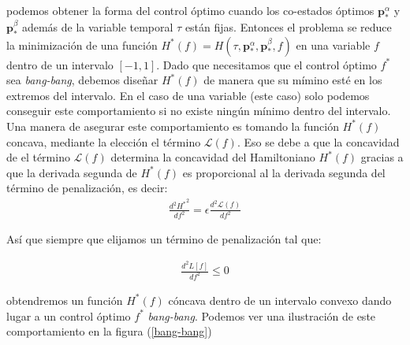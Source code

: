 podemos obtener la forma del control óptimo cuando los co-estados óptimos $\bm{p}_*^\alpha$ y $\bm{p}_*^\beta$ además de la variable temporal $\tau$ están fijas. 
%
Entonces el problema se reduce la minimización de una función $H^*(f) = H(\tau,\bm{p}_*^\alpha,\bm{p}^\beta_*,f)$ en una variable $f$ dentro de un intervalo $[-1,1]$.
%
Dado que necesitamos que el control óptimo $f^*$ sea \emph{bang-bang}, debemos diseñar  $H^*(f)$ de manera que su mímino esté en los extremos del intervalo.
%
En el caso de una variable (este caso) solo podemos conseguir este comportamiento si no existe ningún mínimo dentro del intervalo. Una manera de asegurar este comportamiento es tomando la función $H^*(f)$ concava, mediante la elección el término $\mathcal{L}(f)$. Eso se debe a que la concavidad de el término $\mathcal{L}(f)$ determina la concavidad del Hamiltoniano $H^*(f)$ gracias a que la derivada segunda de $H^*(f)$ es proporcional al la derivada segunda del término de penalización, es decir:
\begin{gather}
    \frac{d^2{H^*}^2}{df^2} = \epsilon \frac{d^2\mathcal{L}(f)}{df^2} 
\end{gather}

Así que siempre que elijamos un término de penalización tal que:

\begin{gather}
    \frac{d^2L[f]}{df^2} \leq 0 
\end{gather}

obtendremos un función $H^*(f)$ cóncava dentro de un intervalo convexo dando lugar a un control óptimo $f^*$  \emph{bang-bang}. Podemos ver una ilustración de este comportamiento en la figura (\ref{bang-bang})
\newline

